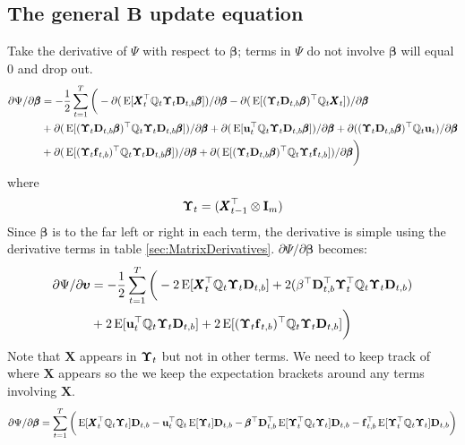 \documentclass[]{article}
\def\bbeta{\pmb{\beta}}
\def\UPS{\mbox{\boldmath $\Upsilon$}}
\def\BB{\mbox{$\mathbf B$}}	\def\bb{\mbox{$\mathbf b$}} \def\Bb{\mbox{$\mathbf J$}} \def\Ba{\mbox{$\mathbf L$}} \def\Bm{\UPS}
\def\DD{\mbox{$\mathbf D$}}	\def\dd{\mbox{$\mathbf d$}}
\def\E{\,\textup{\textrm{E}}}
\def\II{\mbox{$\mathbf I$}} \def\ii{\mbox{$\mathbf i$}}
\def\XX{\mbox{$\pmb{X}$}}	\def\xx{\mbox{$\pmb{x}$}}
\begin{document}
\subsection{The general $\BB$ update equation}
Take the derivative of $\Psi$ with respect to $\bbeta$; terms in $\Psi$  do not involve $\bbeta$ will equal 0 and drop out.  
\begin{equation}\label{eq:B.general1}
\begin{split}
\partial\Psi/\partial\bbeta
 &= - \frac{1}{2}\sum_{t=1}^T \bigg( -\partial(\E[\XX_t^\top\Qm_t\Bm_t\DD_{t,b}\bbeta])/\partial\bbeta
 - \partial(\E[(\Bm_t\DD_{t,b}\bbeta)^\top\Qm_t\XX_t])/\partial\bbeta \\
&+ \partial(\E[(\Bm_t\DD_{t,b}\bbeta)^\top\Qm_t\Bm_t\DD_{t,b}\bbeta])/\partial\bbeta
 + \partial(\E[\uu_t^\top\Qm_t\Bm_t\DD_{t,b}\bbeta])/\partial\bbeta
+ \partial((\Bm_t\DD_{t,b}\bbeta)^\top\Qm_t\uu_t)/\partial\bbeta \\
&+ \partial(\E[(\Bm_t\ff_{t,b})^\top\Qm_t\Bm_t\DD_{t,b}\bbeta])/\partial\bbeta
 + \partial(\E[(\Bm_t\DD_{t,b}\bbeta)^\top\Qm_t\Bm_t\ff_{t,b}])/\partial\bbeta
\bigg)\end{split}
\end{equation}
where
\begin{equation}
\Bm_t = (\XX_{t-1}^\top \otimes \II_m)
\end{equation}Since $\bbeta$ is to the far left or right in each term, the derivative is simple using the derivative terms in table \ref{sec:MatrixDerivatives}.
$\partial\Psi/\partial\bbeta$ becomes:
\begin{equation}\label{eq:B.general1b}
\begin{split}
\partial\Psi/\partial\pmb{\upsilon}
&= - \frac{1}{2}\sum_{t=1}^T \bigg(  
-2\E[\XX_t^\top\Qm_t\Bm_t\DD_{t,b}] + 2(\beta^\top\DD_{t,b}^\top\Bm_t^\top\Qm_t\Bm_t\DD_{t,b})  \\
&+ 2\E[\uu_t^\top\Qm_t\Bm_t\DD_{t,b}] + 2\E[(\Bm_t\ff_{t,b})^\top\Qm_t\Bm_t\DD_{t,b}] \bigg)
\end{split}\end{equation}
Note that $\XX$ appears in $\Bm_t$ but not in other terms. We need to keep track of where $\XX$ appears so the we keep the expectation brackets around any terms involving $\XX$.
\begin{equation}
\begin{split}
\partial\Psi/\partial\bbeta
= \sum_{t=1}^T \bigg(  
\E[\XX_t^\top\Qm_t\Bm_t]\DD_{t,b} - \uu_t^\top\Qm_t\E[\Bm_t]\DD_{t,b} 
- \bbeta^\top\DD_{t,b}^\top\E[\Bm_t^\top\Qm_t\Bm_t]\DD_{t,b} - \ff_{t,b}^\top\E[\Bm_t^\top\Qm_t\Bm_t]\DD_{t,b} \bigg)
\end{split}
\end{equation}
\end{document}
